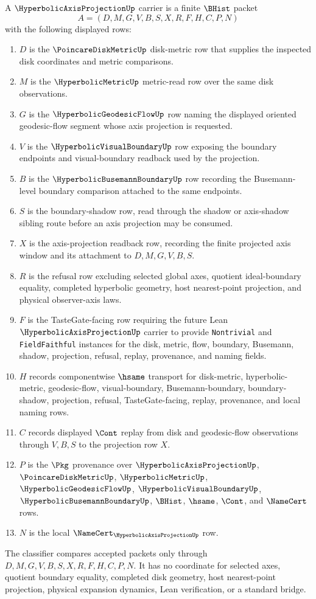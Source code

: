 \begin{definition}
\label{def:hyperbolic-axis-projection-carrier}
A $\HyperbolicAxisProjectionUp$ carrier is a finite $\BHist$ packet
$$
A=(D,M,G,V,B,S,X,R,F,H,C,P,N)
$$
with the following displayed rows:
\begin{enumerate}
\item $D$ is the $\PoincareDiskMetricUp$ disk-metric row that supplies the inspected disk coordinates and metric comparisons.
\item $M$ is the $\HyperbolicMetricUp$ metric-read row over the same disk observations.
\item $G$ is the $\HyperbolicGeodesicFlowUp$ row naming the displayed oriented geodesic-flow segment whose axis projection is requested.
\item $V$ is the $\HyperbolicVisualBoundaryUp$ row exposing the boundary endpoints and visual-boundary readback used by the projection.
\item $B$ is the $\HyperbolicBusemannBoundaryUp$ row recording the Busemann-level boundary comparison attached to the same endpoints.
\item $S$ is the boundary-shadow row, read through the shadow or axis-shadow sibling route before an axis projection may be consumed.
\item $X$ is the axis-projection readback row, recording the finite projected axis window and its attachment to $D,M,G,V,B,S$.
\item $R$ is the refusal row excluding selected global axes, quotient ideal-boundary equality, completed hyperbolic geometry, host nearest-point projection, and physical observer-axis laws.
\item $F$ is the TasteGate-facing row requiring the future Lean $\HyperbolicAxisProjectionUp$ carrier to provide \texttt{Nontrivial} and \texttt{FieldFaithful} instances for the disk, metric, flow, boundary, Busemann, shadow, projection, refusal, replay, provenance, and naming fields.
\item $H$ records componentwise $\hsame$ transport for disk-metric, hyperbolic-metric, geodesic-flow, visual-boundary, Busemann-boundary, boundary-shadow, projection, refusal, TasteGate-facing, replay, provenance, and local naming rows.
\item $C$ records displayed $\Cont$ replay from disk and geodesic-flow observations through $V,B,S$ to the projection row $X$.
\item $P$ is the $\Pkg$ provenance over $\HyperbolicAxisProjectionUp$, $\PoincareDiskMetricUp$, $\HyperbolicMetricUp$, $\HyperbolicGeodesicFlowUp$, $\HyperbolicVisualBoundaryUp$, $\HyperbolicBusemannBoundaryUp$, $\BHist$, $\hsame$, $\Cont$, and $\NameCert$ rows.
\item $N$ is the local $\NameCert_{\HyperbolicAxisProjectionUp}$ row.
\end{enumerate}
The classifier compares accepted packets only through $D,M,G,V,B,S,X,R,F,H,C,P,N$. It has no coordinate for selected axes, quotient boundary equality, completed disk geometry, host nearest-point projection, physical expansion dynamics, Lean verification, or a standard bridge.
\end{definition}

